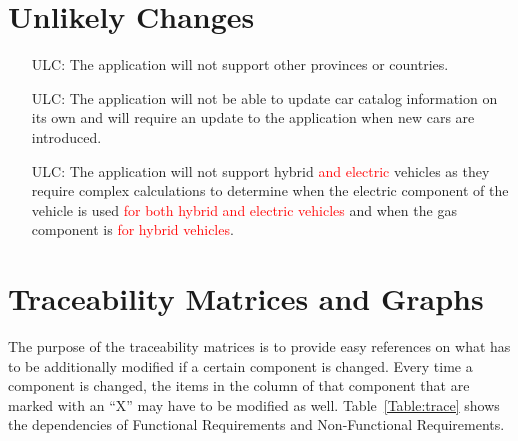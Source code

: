 \documentclass[12pt]{article}
\newcounter{lcnum} %
\newcounter{ulcnum} %
\begin{document}
\section{Unlikely Changes}    

\noindent \begin{itemize}

\item[ULC\refstepcounter{ulcnum}\theulcnum\label{Regional Support}:] The application will not support other provinces or countries.

\item[ULC\refstepcounter{ulcnum}\theulcnum\label{New Cars}:] The application will not be able to update car catalog information on its own and will require an update to the application when new cars are introduced.

\item[ULC\refstepcounter{ulcnum}\theulcnum\label{Hybrid Cars}:] The application will not support hybrid \textcolor{red}{and electric} vehicles as they require complex calculations to determine when the electric component of the vehicle is used \textcolor{red}{for both hybrid and electric vehicles} and when the gas component is \textcolor{red}{for hybrid vehicles}.

\end{itemize}

\newpage

\section{Traceability Matrices and Graphs}

The purpose of the traceability matrices is to provide easy references on what
has to be additionally modified if a certain component is changed.  Every time a
component is changed, the items in the column of that component that are marked
with an ``X'' may have to be modified as well.  Table~\ref{Table:trace} shows the
dependencies of Functional Requirements and Non-Functional Requirements.
\end{document}
